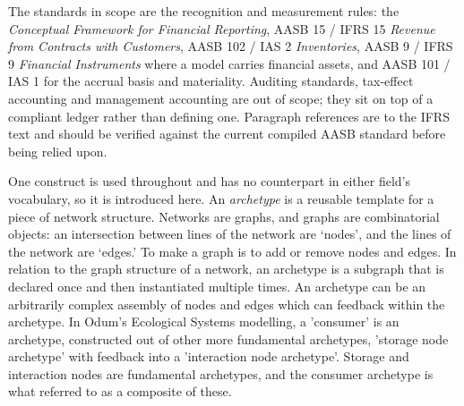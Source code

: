 \documentclass[11pt,a4paper]{article}
\begin{document}
The standards in scope are the recognition and measurement rules: the \emph{Conceptual Framework for Financial Reporting}, AASB 15 / IFRS 15 \emph{Revenue from Contracts with Customers}, AASB 102 / IAS 2 \emph{Inventories}, AASB 9 / IFRS 9 \emph{Financial Instruments} where a model carries financial assets, and AASB 101 / IAS 1 for the accrual basis and materiality. Auditing standards, tax-effect accounting and management accounting are out of scope; they sit on top of a compliant ledger rather than defining one. Paragraph references are to the IFRS text and should be verified against the current compiled AASB standard before being relied upon.

One construct is used throughout and has no counterpart in either field's vocabulary, so it is introduced here. An \emph{archetype} is a reusable template for a piece of network structure. Networks are graphs, and graphs are combinatorial objects: an intersection between lines of the network are `nodes', and the lines of the network are `edges.' To make a graph is to add or remove nodes and edges. In relation to the graph structure of a network, an archetype is a subgraph that is declared once and then instantiated multiple times. An archetype can be an arbitrarily complex assembly of nodes and edges which can feedback within the archetype. In Odum's Ecological Systems modelling, a 'consumer' is an archetype, constructed out of other more fundamental archetypes, 'storage node archetype' with feedback into a 'interaction node archetype'. Storage and interaction nodes are fundamental archetypes, and the consumer archetype is what \cite{odum2000} referred to as a composite of these.  
\end{document}
